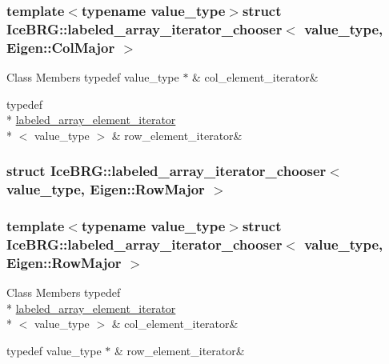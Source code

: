 \subsubsection*{template$<$typename value\+\_\+type$>$struct Ice\+B\+R\+G\+::labeled\+\_\+array\+\_\+iterator\+\_\+chooser$<$ value\+\_\+type, Eigen\+::\+Col\+Major $>$}

\begin{DoxyFields}{Class Members}
\hypertarget{namespaceIceBRG_a470bd4adc8238e62564a1a88f61b1b94}{}typedef value\+\_\+type $\ast$\label{namespaceIceBRG_a470bd4adc8238e62564a1a88f61b1b94}
&
col\+\_\+element\+\_\+iterator&
\\
\hline

\hypertarget{namespaceIceBRG_a0d0e3a3a001e9d30291912aac52b2a19}{}typedef \\*
\hyperlink{classIceBRG_1_1labeled__array__element__iterator}{labeled\+\_\+array\+\_\+element\+\_\+iterator}\\*
$<$ value\+\_\+type $>$\label{namespaceIceBRG_a0d0e3a3a001e9d30291912aac52b2a19}
&
row\+\_\+element\+\_\+iterator&
\\
\hline

\end{DoxyFields}
\label{structIceBRG_1_1labeled__array__iterator__chooser_3_01value__type_00_01Eigen_1_1RowMajor_01_4}
\hypertarget{namespaceIceBRG_structIceBRG_1_1labeled__array__iterator__chooser_3_01value__type_00_01Eigen_1_1RowMajor_01_4}{}
\subsubsection{struct Ice\+B\+R\+G\+:\+:labeled\+\_\+array\+\_\+iterator\+\_\+chooser$<$ value\+\_\+type, Eigen\+:\+:Row\+Major $>$}
\subsubsection*{template$<$typename value\+\_\+type$>$struct Ice\+B\+R\+G\+::labeled\+\_\+array\+\_\+iterator\+\_\+chooser$<$ value\+\_\+type, Eigen\+::\+Row\+Major $>$}

\begin{DoxyFields}{Class Members}
\hypertarget{namespaceIceBRG_a3642e2335dab13b4b2ca944880ea91ed}{}typedef \\*
\hyperlink{classIceBRG_1_1labeled__array__element__iterator}{labeled\+\_\+array\+\_\+element\+\_\+iterator}\\*
$<$ value\+\_\+type $>$\label{namespaceIceBRG_a3642e2335dab13b4b2ca944880ea91ed}
&
col\+\_\+element\+\_\+iterator&
\\
\hline

\hypertarget{namespaceIceBRG_a06513cf891a27ee4f07fd67aed8981df}{}typedef value\+\_\+type $\ast$\label{namespaceIceBRG_a06513cf891a27ee4f07fd67aed8981df}
&
row\+\_\+element\+\_\+iterator&
\\
\hline

\end{DoxyFields}



